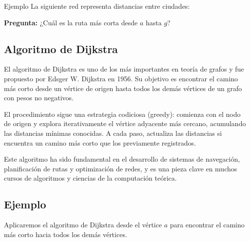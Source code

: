 \begin{exampleblock}{Ejemplo}
La siguiente red representa distancias entre ciudades:

\begin{center}
\end{center}

\vspace{0.5em}
\textbf{Pregunta:} ¿Cuál es la ruta más corta desde $a$ hasta $g$?
\end{exampleblock}




\subsection{Algoritmo de Dijkstra}
El algoritmo de Dijkstra es uno de los más importantes en teoría de grafos y fue propuesto por Edsger W. Dijkstra en 1956. Su objetivo es encontrar el camino más corto desde un vértice de origen hasta todos los demás vértices de un grafo con pesos no negativos.

El procedimiento sigue una estrategia codiciosa (greedy): comienza con el nodo de origen y explora iterativamente el vértice adyacente más cercano, acumulando las distancias mínimas conocidas. A cada paso, actualiza las distancias si encuentra un camino más corto que los previamente registrados.

Este algoritmo ha sido fundamental en el desarrollo de sistemas de navegación, planificación de rutas y optimización de redes, y es una pieza clave en muchos cursos de algoritmos y ciencias de la computación teórica.

\subsection*{Ejemplo}
Aplicaremos el algoritmo de Dijkstra desde el vértice $a$ para encontrar el camino más corto hacia todos los demás vértices.

